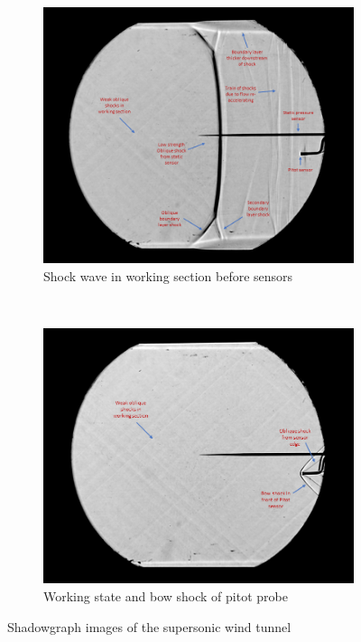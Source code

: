 \documentclass{article}
\begin{document}
\begin{figure}[H]
    \centering
    \begin{subfigure}[t]{0.48\textwidth}
        \centering
        \includegraphics[width=1\textwidth]{../Supersonic_Nozzle/shadowgraph_annotations/slide1.PNG}
        \caption{Shock wave in working section before sensors}

        \label{fig:figure6}
    \end{subfigure}
    ~
    \begin{subfigure}[t]{0.48\textwidth}
        \centering
        \includegraphics[width=1\textwidth]{../Supersonic_Nozzle/shadowgraph_annotations/slide2.PNG}
        \caption{Working state and bow shock of pitot probe}
        \label{fig:figure7}
    \end{subfigure}
    \caption{Shadowgraph images of the supersonic wind tunnel}
\end{figure}
\end{document}
